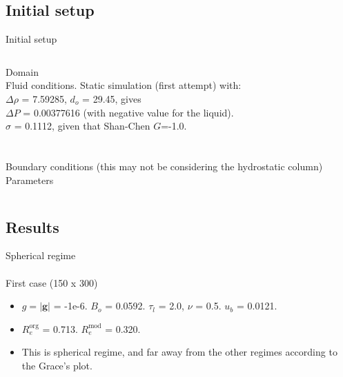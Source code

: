 \documentclass[9pt]{beamer}
\begin{document}
	\subsection{Initial setup}
	\begin{frame}[t]{Initial setup}
		\justifying
		\begin{columns}[t]
			
			Domain\\
			Fluid conditions. Static simulation (first attempt) with:\\ $\Delta \rho $ = 7.59285, $d_o$ = 29.45, gives \\$\Delta P$ = 0.00377616 (with negative value for the liquid). \\$\sigma$ = 0.1112, given that Shan-Chen $G$=-1.0.\\~\\
			~\\
			Boundary conditions (this may not be considering the hydrostatic column)\\
			Parameters\\
			
			
		\end{columns}
	\end{frame}

	\subsection{Results}
	\begin{frame}[t]{Spherical regime}
		\textbf{}\\~\\
		
		First case (150 x 300)
		\begin{itemize}
			\item $g = \vert \mathbf{g}\vert $ = -1e-6. $B_o$ = 0.0592. $\tau_l$ = 2.0, $\nu$ = 0.5. $u_b$ = 0.0121. 
			\item $R_e^{\text{org}}$ = 0.713. $R_e^{\text{mod}}$ = 0.320. 
			
			\item This is spherical regime, and far away from the other regimes according to the Grace's plot. 
		
		\end{itemize}
		
	\end{frame}
	
\end{document}
